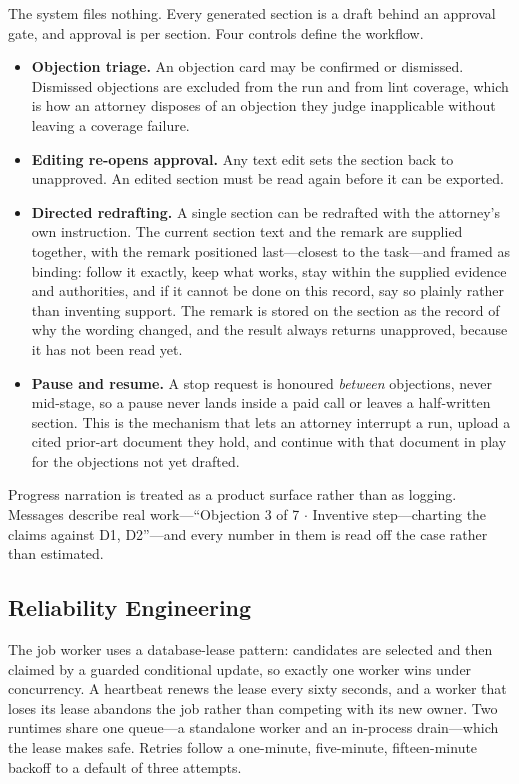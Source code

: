 \documentclass[conference]{IEEEtran}
\begin{document}
The system files nothing. Every generated section is a draft behind an approval gate, and approval is per section. Four controls define the workflow.

\begin{itemize}
\item \textbf{Objection triage.} An objection card may be confirmed or dismissed. Dismissed objections are excluded from the run and from lint coverage, which is how an attorney disposes of an objection they judge inapplicable without leaving a coverage failure.
\item \textbf{Editing re-opens approval.} Any text edit sets the section back to unapproved. An edited section must be read again before it can be exported.
\item \textbf{Directed redrafting.} A single section can be redrafted with the attorney's own instruction. The current section text and the remark are supplied together, with the remark positioned last---closest to the task---and framed as binding: follow it exactly, keep what works, stay within the supplied evidence and authorities, and if it cannot be done on this record, say so plainly rather than inventing support. The remark is stored on the section as the record of why the wording changed, and the result always returns unapproved, because it has not been read yet.
\item \textbf{Pause and resume.} A stop request is honoured \emph{between} objections, never mid-stage, so a pause never lands inside a paid call or leaves a half-written section. This is the mechanism that lets an attorney interrupt a run, upload a cited prior-art document they hold, and continue with that document in play for the objections not yet drafted.
\end{itemize}

Progress narration is treated as a product surface rather than as logging. Messages describe real work---``Objection 3 of 7 $\cdot$ Inventive step---charting the claims against D1, D2''---and every number in them is read off the case rather than estimated.

\subsection{Reliability Engineering}

The job worker uses a database-lease pattern: candidates are selected and then claimed by a guarded conditional update, so exactly one worker wins under concurrency. A heartbeat renews the lease every sixty seconds, and a worker that loses its lease abandons the job rather than competing with its new owner. Two runtimes share one queue---a standalone worker and an in-process drain---which the lease makes safe. Retries follow a one-minute, five-minute, fifteen-minute backoff to a default of three attempts.
\end{document}

